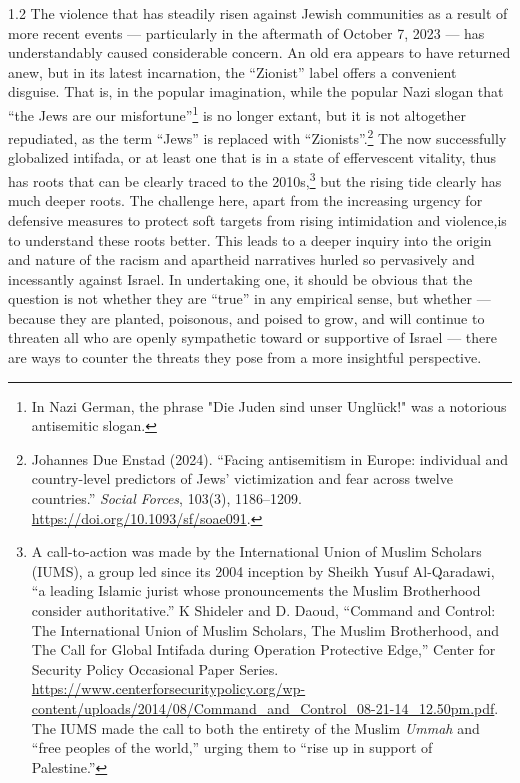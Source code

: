 \documentclass[../unravbook.tex]{subfiles}
\begin{document}
\begin{spacing}{1.2}
The violence that has steadily risen against Jewish communities as a result of more recent events --- particularly in the aftermath of October 7, 2023 --- has understandably caused considerable concern. An old era appears to have returned anew, but in its latest incarnation, the ``Zionist'' label offers a convenient disguise. That is, in the popular imagination, while the popular Nazi slogan that \enquote{the Jews are our misfortune}\footnote{In Nazi German, the phrase "Die Juden sind unser Unglück!" was a notorious antisemitic slogan.} is no longer extant, but it is not altogether repudiated, as the term \enquote{Jews} is replaced with \enquote{Zionists}.\footnote{Johannes Due Enstad (2024). ``Facing antisemitism in Europe: individual and country-level predictors of Jews' victimization and fear across twelve countries.'' \textit{Social Forces}, 103(3), 1186--1209. \url{https://doi.org/10.1093/sf/soae091}.}  The now successfully globalized intifada, or at least one that is in a state of effervescent vitality, thus has roots that can be clearly traced to the 2010s,\footnote{A call-to-action was made by the International Union of Muslim Scholars (IUMS), a group led since its 2004 inception by Sheikh Yusuf Al-Qaradawi, ``a leading  Islamic jurist whose pronouncements the Muslim Brotherhood consider authoritative.'' K Shideler and D. Daoud, ``Command and Control: The International Union of Muslim Scholars, The Muslim Brotherhood, and The Call for Global Intifada during Operation Protective Edge,'' Center for Security Policy Occasional Paper Series.  \url{https://www.centerforsecuritypolicy.org/wp-content/uploads/2014/08/Command_and_Control_08-21-14_12.50pm.pdf}. The IUMS made the call to both the entirety of the Muslim \textit{Ummah} and ``free peoples of the world,'' urging them to ``rise up in support of Palestine.''} but the rising tide clearly has much deeper roots. The challenge here, apart from the increasing urgency for defensive measures to protect soft targets from rising intimidation and violence,is to understand these roots better. This leads to a deeper inquiry into the origin and nature of the racism and apartheid narratives hurled so pervasively and incessantly against Israel. In undertaking one, it should be obvious that the question is not whether they are ``true'' in any empirical sense, but whether --- because they are planted, poisonous, and poised to grow, and will continue to threaten all who are openly sympathetic toward or supportive of Israel  --- there are ways to counter the threats they pose from a more insightful perspective. 


\end{spacing}
\end{document}
